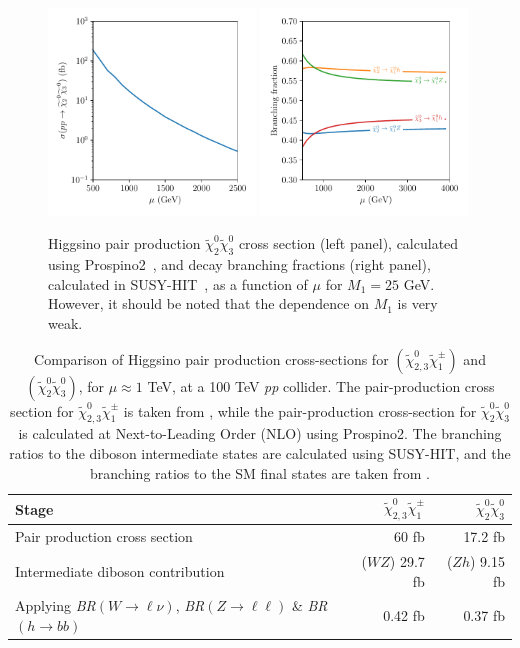 \documentclass[a4paper,11pt]{article}
\newcommand{\N}{\widetilde{\chi}^0}
\newcommand{\C}{\widetilde{\chi}^\pm}
\begin{document}
\begin{figure}[h]
  \centering
  \includegraphics[width=0.49\textwidth]{images/xsection_plot.pdf}
  \includegraphics[width=0.49\textwidth]{images/br_plot.pdf}
  \caption{Higgsino pair production $\N_2\N_3$
    cross section (left panel), calculated using
    Prospino2~\cite{Beenakker:1999xh},  and decay branching fractions
    (right panel), calculated in SUSY-HIT~\cite{Djouadi:2006bz},  as a function
    of $\mu$ for $M_1=25$ GeV. However, it should be noted that the dependence
    on $M_1$ is very weak.
}
  \label{fig:xsection_plot}
\end{figure}

\begin{table}
  \centering
  \begin{tabular}{l|rr}
    \toprule
    Stage & $\N_{2,3}\C_1$ & $\N_2\N_3$\\
    \midrule
    Pair production cross section & 60 fb & 17.2 fb\\
    Intermediate diboson contribution & ($WZ$) 29.7 fb  & ($Zh$) 9.15 fb \\
    Applying \emph{BR}$(W\rightarrow \ell\nu)$, \emph{BR}$(Z\rightarrow \ell\ell)$ \& \emph{BR}$(h\rightarrow bb)$ & 0.42 fb & 0.37 fb\\
    \bottomrule
  \end{tabular}
  \caption{Comparison of Higgsino pair production cross-sections for
    $(\N_{2,3}\C_1)$ and
    $(\N_{2}\N_{3})$, for $\mu\approx 1$ TeV, at a 100
    TeV \emph{pp} collider. 
    The pair-production cross section for $\N_{2,3}\C_1$ is taken from
    \cite{Gori:2014oua}, while the pair-production cross-section for $\N_2\N_3$
    is calculated at Next-to-Leading Order (NLO) using Prospino2. The branching
    ratios to the diboson intermediate states are calculated using SUSY-HIT,
    and the branching ratios to the SM final states are taken from
    \cite{Olive:2016xmw}.}
  \label{tab:xsections}
\end{table}
\end{document}
